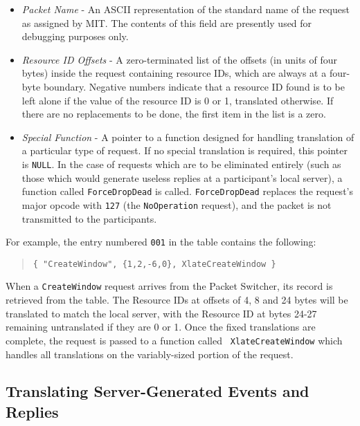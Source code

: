 \begin{itemize}

\item {\it Packet Name} - An ASCII representation of the standard name
of the request as assigned by MIT.  The contents of this field are
presently used for debugging purposes only.

\item {\it Resource ID Offsets} - A zero-terminated list of the offsets
(in units of four bytes) inside the request containing resource IDs,
which are always at a four-byte boundary.  Negative numbers indicate
that a resource ID found is to be left alone if the value of the
resource ID is 0 or 1, translated otherwise. If there are no
replacements to be done, the first item in the list is a zero.

\item {\it Special Function} - A pointer to a function designed for
handling translation of a particular type of request.  If no special
translation is required, this pointer is {\tt NULL}.  In the case of
requests which are to be eliminated entirely (such as those which would
generate useless replies at a participant's local server), a function
called {\tt ForceDropDead} is called.  {\tt ForceDropDead} replaces the
request's major opcode with {\tt 127} (the {\tt NoOperation} request),
and the packet is not transmitted to the participants.

\end{itemize}

\noindent
For example, the entry numbered {\tt 001} in the table contains the
following:

\begin{quote}
{\tt \{ "CreateWindow", \{1,2,-6,0\}, XlateCreateWindow \}}
\end{quote}

\noindent

When a {\tt CreateWindow} request arrives from the
Packet Switcher, its record is retrieved from the table.  The Resource
IDs at offsets of 4, 8 and 24 bytes will be translated to match the
local server, with the Resource ID at bytes 24-27 remaining
untranslated if they are 0 or 1.  Once the fixed translations are
complete, the request is passed to a function called {\tt
XlateCreateWindow} which handles all translations on the variably-sized
portion of the request.

\subsection{Translating Server-Generated Events and Replies}

